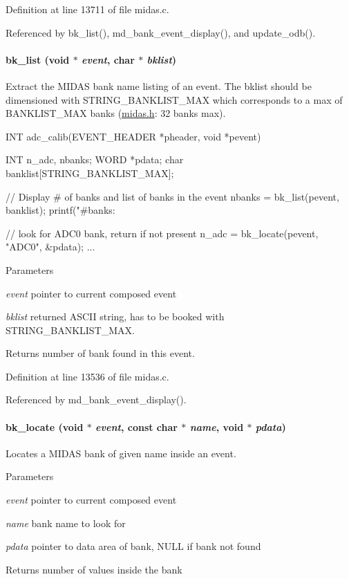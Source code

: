 Definition at line 13711 of file midas.c.

Referenced by bk\_\-list(), md\_\-bank\_\-event\_\-display(), and update\_\-odb().
\paragraph[{bk\_\-list}]{ bk\_\-list (void $\ast$ {\em event}, \/  char $\ast$ {\em bklist})}\hfill\label{group__bkfunctionc_ga4d8a0ef23239ae478544fa96a0e98a33}
Extract the MIDAS bank name listing of an event. The bklist should be dimensioned with STRING\_\-BANKLIST\_\-MAX which corresponds to a max of BANKLIST\_\-MAX banks (\hyperlink{midas_8h}{midas.h}: 32 banks max). 
\begin{DoxyCode}
INT adc_calib(EVENT_HEADER *pheader, void *pevent)
{
  INT    n_adc, nbanks;
  WORD   *pdata;
  char   banklist[STRING_BANKLIST_MAX];

  // Display # of banks and list of banks in the event
  nbanks = bk_list(pevent, banklist);
  printf("#banks:%

  // look for ADC0 bank, return if not present
  n_adc = bk_locate(pevent, "ADC0", &pdata);
  ...
}
\end{DoxyCode}
 
\begin{DoxyParams}{Parameters}
\item[{\em event}]pointer to current composed event \item[{\em bklist}]returned ASCII string, has to be booked with STRING\_\-BANKLIST\_\-MAX. \end{DoxyParams}
\begin{DoxyReturn}{Returns}
number of bank found in this event. 
\end{DoxyReturn}


Definition at line 13536 of file midas.c.

Referenced by md\_\-bank\_\-event\_\-display().
\paragraph[{bk\_\-locate}]{ bk\_\-locate (void $\ast$ {\em event}, \/  const char $\ast$ {\em name}, \/  void $\ast$ {\em pdata})}\hfill\label{group__bkfunctionc_gafe085ddb11bdcff4ca461224254289ef}
Locates a MIDAS bank of given name inside an event. 
\begin{DoxyParams}{Parameters}
\item[{\em event}]pointer to current composed event \item[{\em name}]bank name to look for \item[{\em pdata}]pointer to data area of bank, NULL if bank not found \end{DoxyParams}
\begin{DoxyReturn}{Returns}
number of values inside the bank 
\end{DoxyReturn}


